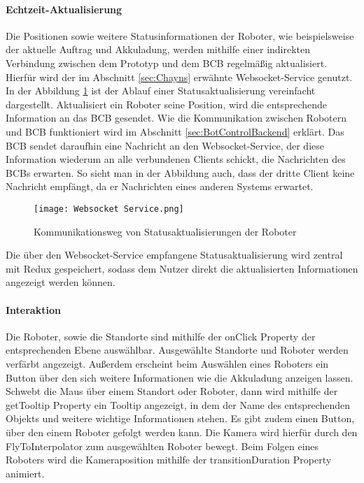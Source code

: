 \paragraph{Echtzeit-Aktualisierung}
Die Positionen sowie weitere Statusinformationen der Roboter, wie beispielsweise der aktuelle Auftrag und Akkuladung, werden mithilfe einer indirekten Verbindung zwischen dem Prototyp und dem \ac{BCB} regelmäßig aktualisiert. Hierfür wird der im Abschnitt \ref{sec:Chayns} erwähnte \gls{Websocket}-Service genutzt. In der Abbildung \ref{fig:RobotStatusUpdate} ist der Ablauf einer Statusaktualisierung vereinfacht dargestellt. Aktualisiert ein Roboter seine Position, wird die entsprechende Information an das \ac{BCB} gesendet. Wie die Kommunikation zwischen Robotern und \ac{BCB} funktioniert wird im Abschnitt \ref{sec:BotControlBackend} erklärt. Das \ac{BCB} sendet daraufhin eine Nachricht an den \gls{Websocket}-Service, der diese Information wiederum an alle verbundenen Clients schickt, die Nachrichten des \ac{BCB}s erwarten. So sieht man in der Abbildung auch, dass der dritte Client keine Nachricht empfängt, da er Nachrichten eines anderen Systems erwartet.

\begin{figure}[H]
    \centering
    \caption{Kommunikationsweg von Statusaktualisierungen der Roboter}\label{fig:RobotStatusUpdate}
    \texttt{[image: Websocket Service.png]}
\end{figure}

Die über den \gls{Websocket}-Service empfangene Statusaktualisierung wird zentral mit Redux gespeichert, sodass dem Nutzer direkt die aktualisierten Informationen angezeigt werden können.

\paragraph{Interaktion}
Die Roboter, sowie die Standorte sind mithilfe der onClick Property der entsprechenden Ebene \cite{DeckglInteractivity} auswählbar. Ausgewählte Standorte und Roboter werden verfärbt angezeigt. Außerdem erscheint beim Auswählen eines Roboters ein Button über den sich weitere Informationen wie die Akkuladung anzeigen lassen. Schwebt die Maus über einem Standort oder Roboter, dann wird mithilfe der getTooltip Property \cite{DeckglDeckClass} ein Tooltip angezeigt, in dem der Name des entsprechenden Objekts und weitere wichtige Informationen stehen. Es gibt zudem einen Button, über den einem Roboter gefolgt werden kann. Die Kamera wird hierfür durch den FlyToInterpolator \cite{DeckglFlyToInterpolator} zum ausgewählten Roboter bewegt. Beim Folgen eines Roboters wird die Kameraposition mithilfe der transitionDuration Property \cite{DeckglAnimationsAndTransitions} animiert.

